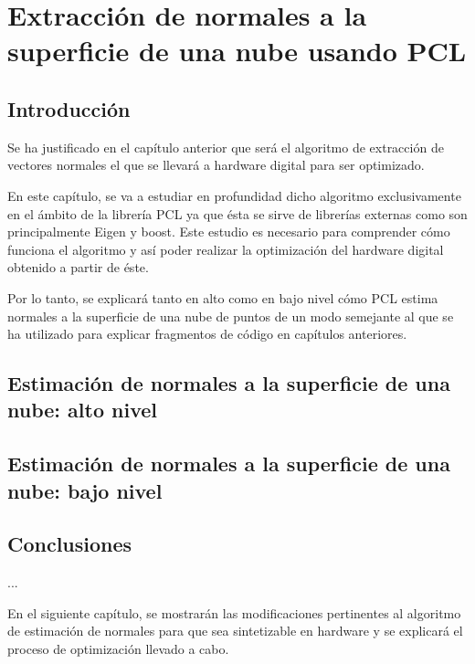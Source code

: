\chapter{Extracción de normales a la superficie de una nube usando PCL}
\section{Introducción}
Se ha justificado en el capítulo anterior que será el algoritmo de extracción de vectores normales el que se llevará a hardware digital para ser optimizado. 

En este capítulo, se va a estudiar en profundidad dicho algoritmo exclusivamente en el ámbito de la librería PCL ya que ésta se sirve de librerías externas como son principalmente Eigen y boost. Este estudio es necesario para comprender cómo funciona el algoritmo y así poder realizar la optimización del hardware digital obtenido a partir de éste.

Por lo tanto, se explicará tanto en alto como en bajo nivel cómo PCL estima normales a la superficie de una nube de puntos de un modo semejante al que se ha utilizado para explicar fragmentos de código en capítulos anteriores.



\section{Estimación de normales a la superficie de una nube: alto nivel}

\section{Estimación de normales a la superficie de una nube: bajo nivel}


\section{Conclusiones}
...

En el siguiente capítulo, se mostrarán las modificaciones pertinentes al algoritmo de estimación de normales para que sea sintetizable en hardware y se explicará el proceso de optimización llevado a cabo.